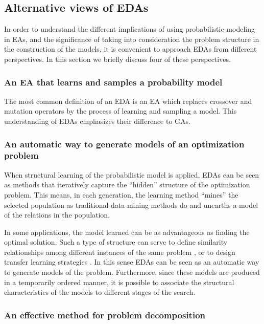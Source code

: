 \documentclass{article} %
\begin{document}
 

\subsection{Alternative views of EDAs}

 In order to understand the different implications of using probabilistic modeling in EAs, and the significance of taking into consideration the problem structure in the construction of the models,   it is convenient to approach EDAs from different perspectives. In this section we briefly discuss four of these perspectives. 

 \subsubsection{An EA that learns and samples a probability model}

   The most common definition of an EDA is an EA which replaces crossover and mutation operators by the process of learning and sampling a model. This understanding of EDAs emphasizes their difference to GAs. 

 \subsubsection{An automatic way to generate models of an optimization problem} 

  When structural learning of the probabilistic model is applied, EDAs can be seen as methods that iteratively capture the ``hidden'' structure of the optimization problem. This means, in each generation, the learning method ``mines'' the selected population as traditional data-mining methods \cite{Hastie_et_al:2001} do and unearths a model of the relations in the population. 


In some applications, the model learned can be as advantageous as finding the optimal solution. Such a type of structure can serve to define similarity relationships among different instances of the same problem \cite{Hauschild_et_al:2008,Santana_et_al:2013}, or to design transfer learning strategies \cite{Kaedi_and_Ghasem:2011,Pelikan_and_Hauschild:2012,Santana_et_al:2012f}. In this sense EDAs can be seen as  an automatic way to generate models of the problem. Furthermore, since these models are produced in a temporarily ordered manner, it is possible to  associate the  structural characteristics of the models to different stages of the search.

\subsubsection{An effective method for problem decomposition} \label{sec:PROBDECOMP}
\end{document}
